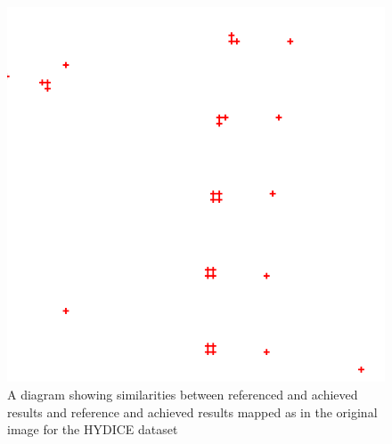 \begin{figure}[H]
\begin{minipage}{.35\textwidth}
\end{minipage}
\begin{minipage}{.35\textwidth}
  \centering
  \includegraphics[width=\linewidth, frame]{figures/hydice_tar.png}
\end{minipage}
\caption[Results for the HYDICE dataset]{A diagram showing similarities between referenced and achieved results and reference and achieved results mapped as in the original image for the HYDICE dataset}
\label{fig:hy_3}
\end{figure}
\newpage
